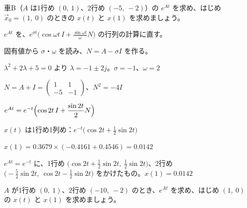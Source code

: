 \begin{reidai}[車B（ゆれる）]
車B（$A$ は1行め $(0,\ 1)$、2行め $(-5,\ -2)$）の $e^{At}$ を求め、はじめ $\vec x_0=(1,\ 0)$ のときの $x(t)$ と $x(1)$ を求めましょう。\par
\kangaekata {}\par
{}\enspace $e^{At}$ を、$e^{\sigma t}\bigl(\cos\omega t\,I+\frac{\sin\omega t}{\omega}N\bigr)$ の行列の計算に直す。\par
{}\enspace 固有値から $\sigma$・$\omega$ を読み、$N=A-\sigma I$ を作る。\par
\shiki\kixls{}\zw{} $\lambda^2+2\lambda+5=0$ より $\lambda=-1\pm2j$。$\sigma=-1$、$\omega=2$\par
\kixla $N=A+I=\begin{pmatrix}1&1\\-5&-1\end{pmatrix}$、$N^2=-4I$\par
\kixla $e^{At}=e^{-t}\Bigl(\cos2t\,I+\dfrac{\sin2t}{2}N\Bigr)$\par
\kixla $x(t)$ は1行め1列め：$e^{-t}\bigl(\cos2t+\tfrac12\sin2t\bigr)$\par
\kixla $x(1)=0.3679\times(-0.4161+0.4546)=0.0142$\par
\kotae $e^{At}=e^{-t}$ に、1行め $\bigl(\cos2t+\tfrac12\sin2t,\ \tfrac12\sin2t\bigr)$、2行め $\bigl(-\tfrac52\sin2t,\ \cos2t-\tfrac12\sin2t\bigr)$ をかけたもの。$x(1)=0.0142$
\end{reidai}

\begin{jibun}
$A$ が1行め $(0,\ 1)$、2行め $(-10,\ -2)$ のとき、$e^{At}$ を求め、はじめ $(1,\ 0)$ の $x(t)$ と $x(1)$ を求めましょう。
\end{jibun}

